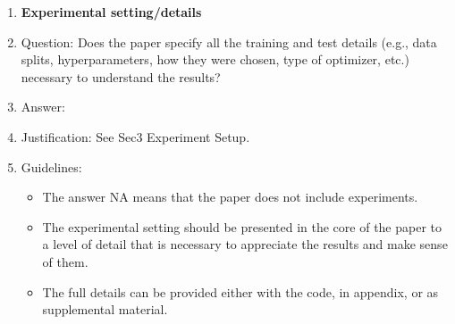 \documentclass{article}
\begin{document}
\begin{enumerate}
\item {\bf Experimental setting/details}
    \item[] Question: Does the paper specify all the training and test details (e.g., data splits, hyperparameters, how they were chosen, type of optimizer, etc.) necessary to understand the results?
    \item[] Answer: \answerYes{} %
    \item[] Justification: See Sec3 Experiment Setup.
    \item[] Guidelines:
    \begin{itemize}
        \item The answer NA means that the paper does not include experiments.
        \item The experimental setting should be presented in the core of the paper to a level of detail that is necessary to appreciate the results and make sense of them.
        \item The full details can be provided either with the code, in appendix, or as supplemental material.
    \end{itemize}


\end{enumerate}
\end{document}
